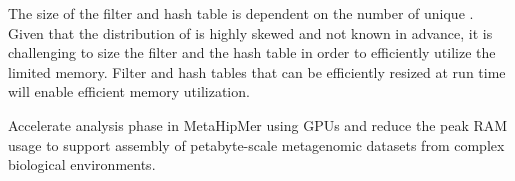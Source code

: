 The size of the filter and hash table is dependent on the number of unique \kmers. Given that the distribution of \kmers is highly skewed and not known in advance, it is challenging to size the filter and the hash table in order to efficiently utilize the limited memory. Filter and hash tables that can be efficiently resized at run time will enable efficient memory utilization.


\begin{rproblem}
Accelerate \kmer analysis phase in MetaHipMer using GPUs and reduce the peak RAM usage to support assembly of petabyte-scale metagenomic datasets from complex biological environments.
\label{rprob:metahipmer}
\end{rproblem}
